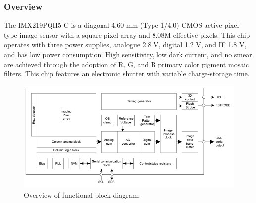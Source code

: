 \documentclass[10pt]{article}
\begin{document}
\begin{multicols}{2}
\subsubsection{Overview}
The IMX219PQH5-C is a diagonal 4.60 mm (Type 1/4.0) CMOS active pixel type image sensor with a square pixel array and 8.08M effective pixels. This chip operates with three power supplies, analogue 2.8 V, digital 1.2 V, and IF 1.8 V, and has low power consumption. High sensitivity, low dark current, and no smear are achieved through the adoption of R, G, and B primary color pigment mosaic filters. This chip features an electronic shutter with variable charge-storage time.
\begin{figure}[H]
    \centering
    \includegraphics[width=1\linewidth]{Images/Week 2/sony-imx.png}
    \caption{Overview of functional block diagram.}
\end{figure}


\end{multicols}
\end{document}
